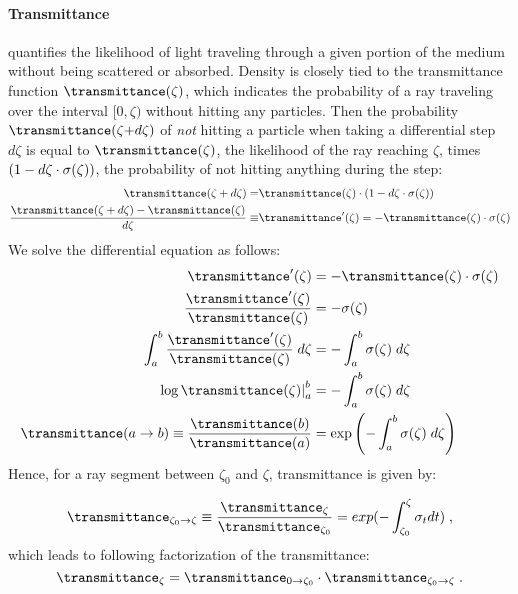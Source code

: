 \paragraph{Transmittance} quantifies the likelihood of light traveling through a given portion of the medium without being scattered or absorbed. Density is closely tied to the transmittance function $\transmittance(\zeta)$, which indicates the probability of a ray traveling over the interval $[0, \zeta)$ without hitting any particles. Then the probability $\transmittance(\zeta {+} d\zeta)$ of \emph{not} hitting a particle when taking a differential step $d\zeta$ is equal to $\transmittance(\zeta)$, the likelihood of the ray reaching $\zeta$, times $(1 - d\zeta \cdot \sigma(\zeta))$, the probability of not hitting anything during the step:
% 
\begin{align}
\transmittance(\zeta+d\zeta) =& \transmittance(\zeta) \cdot (1 - d\zeta \cdot \density(\zeta))
\\
\frac{\transmittance(\zeta+d\zeta) - \transmittance(\zeta)}{d\zeta} \equiv& \transmittance'(\zeta) = -\transmittance(\zeta) \cdot \sigma(\zeta) 
\label{eq:derivative}
\end{align}
% 
We solve the differential equation as follows:
%
\begin{align}
\transmittance'(\zeta) &= -\transmittance(\zeta) \cdot \density(\zeta) \\
\frac{\transmittance'(\zeta)}{\transmittance(\zeta)} &= -\density(\zeta) \\
\int_a^b \frac{\transmittance'(\zeta)}{\transmittance(\zeta)} \; d\zeta &= -\int_a^b \density(\zeta) \; d\zeta \\
\left. \log \transmittance(\zeta) \right|_a^b &= -\int_a^b \density(\zeta) \; d\zeta \\
\transmittance(a \rightarrow b) \equiv \frac{\transmittance(b)}{\transmittance(a)} &= \exponential{-\int_a^b \density(\zeta) \; d\zeta}   
\end{align}
% 
Hence, for a ray segment between $\zeta_0$ and $\zeta$, transmittance is given by:

\begin{equation}
\transmittance_{\zeta_0 \rightarrow \zeta} \equiv \frac{\transmittance_{\zeta}}{\transmittance_{\zeta_0}} = exp({-\int_{\zeta_0}^\zeta \density_t dt})\;,
\label{eq:trans_ab}
\end{equation}
which leads to following factorization of the transmittance:
\begin{equation}
\transmittance_{\zeta} = \transmittance_{0 \rightarrow \zeta_0} \cdot \transmittance_{\zeta_0 \rightarrow \zeta}\;.
\label{eq:factor}
\end{equation}

